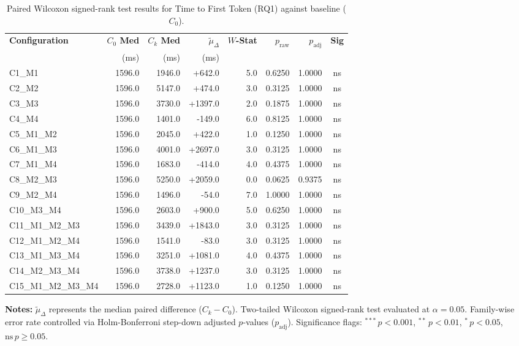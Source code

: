 \begin{table}[!htbp]
\centering
\small
\caption{Paired Wilcoxon signed-rank test results for Time to First Token (RQ1) against baseline ($C_0$).}
\label{tab:wilcoxon_rq1_ttft}
\begin{tabular*}{\textwidth}{@{\extracolsep{\fill}} l r r r r r r c @{}}
\toprule
\textbf{Configuration} & \textbf{$C_0$ Med} & \textbf{$C_k$ Med} & \textbf{$\tilde{\mu}_\Delta$} & \textbf{$W$-Stat} & \textbf{$p_{\text{raw}}$} & \textbf{$p_{\text{adj}}$} & \textbf{Sig} \\
 & \scriptsize{(ms)} & \scriptsize{(ms)} & \scriptsize{(ms)} & & & & \\
\midrule
C1\_M1 & 1596.0 & 1946.0 & +642.0 & 5.0 & 0.6250 & 1.0000 & ns \\
C2\_M2 & 1596.0 & 5147.0 & +474.0 & 3.0 & 0.3125 & 1.0000 & ns \\
C3\_M3 & 1596.0 & 3730.0 & +1397.0 & 2.0 & 0.1875 & 1.0000 & ns \\
C4\_M4 & 1596.0 & 1401.0 & -149.0 & 6.0 & 0.8125 & 1.0000 & ns \\
C5\_M1\_M2 & 1596.0 & 2045.0 & +422.0 & 1.0 & 0.1250 & 1.0000 & ns \\
C6\_M1\_M3 & 1596.0 & 4001.0 & +2697.0 & 3.0 & 0.3125 & 1.0000 & ns \\
C7\_M1\_M4 & 1596.0 & 1683.0 & -414.0 & 4.0 & 0.4375 & 1.0000 & ns \\
C8\_M2\_M3 & 1596.0 & 5250.0 & +2059.0 & 0.0 & 0.0625 & 0.9375 & ns \\
C9\_M2\_M4 & 1596.0 & 1496.0 & -54.0 & 7.0 & 1.0000 & 1.0000 & ns \\
C10\_M3\_M4 & 1596.0 & 2603.0 & +900.0 & 5.0 & 0.6250 & 1.0000 & ns \\
C11\_M1\_M2\_M3 & 1596.0 & 3439.0 & +1843.0 & 3.0 & 0.3125 & 1.0000 & ns \\
C12\_M1\_M2\_M4 & 1596.0 & 1541.0 & -83.0 & 3.0 & 0.3125 & 1.0000 & ns \\
C13\_M1\_M3\_M4 & 1596.0 & 3251.0 & +1081.0 & 4.0 & 0.4375 & 1.0000 & ns \\
C14\_M2\_M3\_M4 & 1596.0 & 3738.0 & +1237.0 & 3.0 & 0.3125 & 1.0000 & ns \\
C15\_M1\_M2\_M3\_M4 & 1596.0 & 2728.0 & +1123.0 & 1.0 & 0.1250 & 1.0000 & ns \\
\bottomrule
\end{tabular*}
\vspace{0.5em}
\parbox{\textwidth}{\footnotesize
\textbf{Notes:} $\tilde{\mu}_\Delta$ represents the median paired difference ($C_k - C_0$). Two-tailed Wilcoxon signed-rank test evaluated at $\alpha = 0.05$. Family-wise error rate controlled via Holm-Bonferroni step-down adjusted $p$-values ($p_{\text{adj}}$). Significance flags: $^{***}\,p < 0.001$, $^{**}\,p < 0.01$, $^{*}\,p < 0.05$, $\text{ns}\,p \ge 0.05$.}
\end{table}
